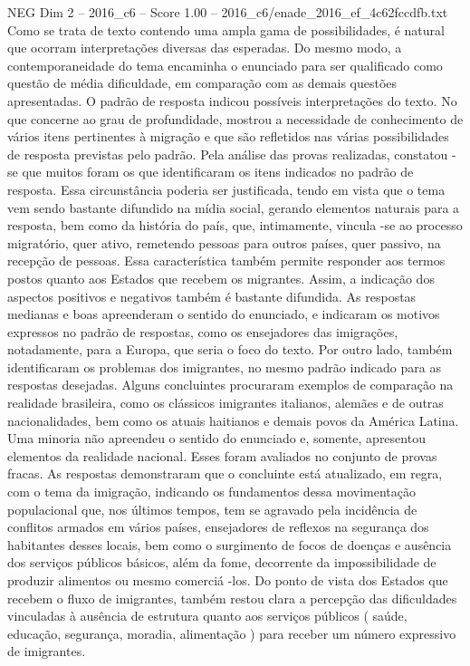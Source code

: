 \begin{textsample}{NEG Dim 2 – 2016\_c6 – Score 1.00 – 2016\_c6/enade\_2016\_ef\_4c62fccdfb.txt}
Como se trata de texto contendo uma ampla gama de possibilidades, é natural que ocorram interpretações diversas das esperadas.
Do mesmo modo, a contemporaneidade do tema encaminha o enunciado para ser qualificado como questão de média dificuldade, em comparação com as demais questões apresentadas.
O padrão de resposta indicou possíveis interpretações do texto.
No que concerne ao grau de profundidade, mostrou a necessidade de conhecimento de vários itens pertinentes à migração e que são refletidos nas várias possibilidades de resposta previstas pelo padrão.
Pela análise das provas realizadas, constatou -se que muitos foram os que identificaram os itens indicados no padrão de resposta.
Essa circunstância poderia ser justificada, tendo em vista que o tema vem sendo bastante difundido na mídia social, gerando elementos naturais para a resposta, bem como da história do país, que, intimamente, vincula -se ao processo migratório, quer ativo, remetendo pessoas para outros países, quer passivo, na recepção de pessoas.
Essa característica também permite responder aos termos postos quanto aos Estados que recebem os migrantes.
Assim, a indicação dos aspectos positivos e negativos também é bastante difundida.
As respostas medianas e boas apreenderam o sentido do enunciado, e indicaram os motivos expressos no padrão de respostas, como os ensejadores das imigrações, notadamente, para a Europa, que seria o foco do texto.
Por outro lado, também identificaram os problemas dos imigrantes, no mesmo padrão indicado para as respostas desejadas.
Alguns concluintes procuraram exemplos de comparação na realidade brasileira, como os clássicos imigrantes italianos, alemães e de outras nacionalidades, bem como os atuais haitianos e demais povos da América Latina.
Uma minoria não apreendeu o sentido do enunciado e, somente, apresentou elementos da realidade nacional.
Esses foram avaliados no conjunto de provas fracas.
As respostas demonstraram que o concluinte está atualizado, em regra, com o tema da imigração, indicando os fundamentos dessa movimentação populacional que, nos últimos tempos, tem se agravado pela incidência de conflitos armados em vários países, ensejadores de reflexos na segurança dos habitantes desses locais, bem como o surgimento de focos de doenças e ausência dos serviços públicos básicos, além da fome, decorrente da impossibilidade de produzir alimentos ou mesmo comerciá -los.
Do ponto de vista dos Estados que recebem o fluxo de imigrantes, também restou clara a percepção das dificuldades vinculadas à ausência de estrutura quanto aos serviços públicos ( saúde, educação, segurança, moradia, alimentação ) para receber um número expressivo de imigrantes.

\end{textsample}
